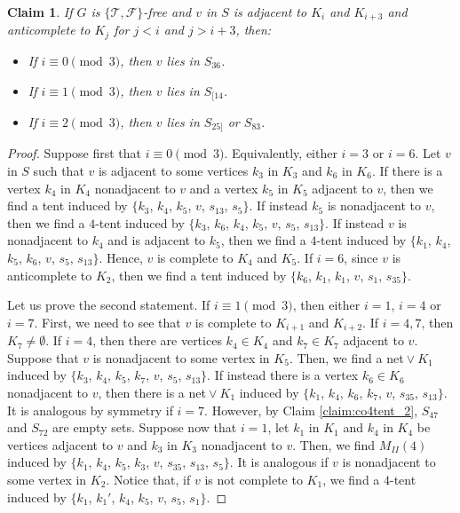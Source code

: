\documentclass[12pt]{book}
\theoremstyle{plain}
\newtheorem{claim}[teo]{Claim}
\theoremstyle{remark}
\begin{document}
\begin{claim} \label{claim:co4tent_4} %
	If $G$ is $\{ \mathcal{T}, \mathcal{F} \}$-free and $v$ in $S$ is adjacent to $K_i$ and $K_{i+3}$ and anticomplete to $K_j$ for $j < i$ and $j>i+3$, then:
	\begin{itemize}
		\item If $i \equiv 0 \pmod{3}$, then $v$ lies in $S_{36}$.
		\item If $i \equiv 1 \pmod 3$, then $v$ lies in $S_{[14}$.
		\item If $i \equiv 2 \pmod{3}$, then $v$ lies in $S_{25]}$ or $S_{83}$.
	\end{itemize}
\end{claim}

\begin{proof}
	Suppose first that $i \equiv 0 \pmod{3}$. Equivalently, either $i=3$ or $i= 6$. 
	Let $v$ in $S$ such that $v$ is adjacent to some vertices $k_3$ in $K_3$ and $k_6$ in $K_6$. If there is a vertex $k_4$ in $K_4$ nonadjacent to $v$ and a vertex $k_5$ in $K_5$ adjacent to $v$, then we find a tent induced by $\{ k_3$, $k_4$, $k_5$, $v$, $s_{13}$, $s_5 \}$. If instead $k_5$ is nonadjacent to $v$, then we find a $4$-tent induced by $\{k_3$, $k_6$, $k_4$, $k_5$, $v$, $s_5$, $s_{13}\}$.
	If instead $v$ is nonadjacent to $k_4$ and is adjacent to $k_5$, then we find a $4$-tent induced by $\{k_1$, $k_4$, $k_5$, $k_6$, $v$, $s_5$, $s_{13}\}$. Hence, $v$ is complete to $K_4$ and $K_5$.
	 If $i=6$, since $v$ is anticomplete to $K_2$, then we find a tent induced by $\{k_6$, $k_1$, $k_1$, $v$, $s_1$, $s_{35}\}$.


	Let us prove the second statement. If $i \equiv 1 \pmod 3$, then either $i = 1$, $i=4$ or $i=7$.
	First, we need to see that $v$ is complete to $K_{i+1}$ and $K_{i+2}$. If $i=4,7$, then $K_7 \neq \emptyset$. If $i=4$, then there are vertices $k_4 \in K_4$ and $k_7 \in K_7$ adjacent to $v$. Suppose that $v$ is nonadjacent to some vertex in $K_5$. Then, we find a net${}\vee K_1$ induced by $\{k_3$, $k_4$, $k_5$, $k_7$, $v$, $s_5$, $s_{13}\}$. If instead there is a vertex $k_6 \in K_6$ nonadjacent to $v$, then there is a net${}\vee K_1$ induced by $\{k_1$, $k_4$, $k_6$, $k_7$, $v$, $s_{35}$, $s_{13}\}$. It is analogous by symmetry if $i=7$.
	However, by Claim \ref{claim:co4tent_2}, $S_{47}$ and $S_{72}$ are empty sets.
	Suppose now that $i=1$, let $k_1$ in $K_1$ and $k_4$ in $K_4$ be vertices adjacent to $v$ and $k_3$ in $K_3$ nonadjacent to $v$. Then, we find $M_{II}(4)$ induced by $\{k_1$, $k_4$, $k_5$, $k_3$, $v$, $s_{35}$, $s_{13}$, $s_5 \}$. It is analogous if $v$ is nonadjacent to some vertex in $K_2$. Notice that, if $v$ is not complete to $K_1$, we find a $4$-tent induced by $\{k_1$, $k_1'$, $k_4$, $k_5$, $v$, $s_5$, $s_1 \}$.
			 

\end{proof}
\end{document}
